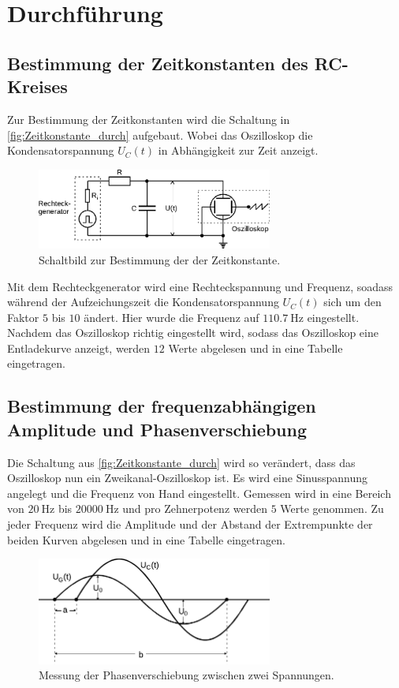 \section{Durchführung}
\label{sec:Durchführung}

\subsection{Bestimmung der Zeitkonstanten des RC-Kreises} %
\label{sub:Zeitkonstante_durch}
Zur Bestimmung der Zeitkonstanten wird die Schaltung in \autoref{fig:Zeitkonstante_durch} aufgebaut.
Wobei das Oszilloskop die Kondensatorspannung $U_C(t)$ in Abhängigkeit zur Zeit anzeigt.
\begin{figure}[H]
    \centering
    \includegraphics[width=0.69\textwidth]{build/Abb_3.pdf}
    \caption{Schaltbild zur Bestimmung der der Zeitkonstante.\cite{v353}}
    \label{fig:Zeitkonstante_durch}
\end{figure}
\noindent Mit dem Rechteckgenerator wird eine Rechteckspannung und Frequenz, soadass während der Aufzeichungszeit die Kondensatorspannung $U_C(t)$ sich um den Faktor $5$ bis $10$ ändert.
Hier wurde die Frequenz auf $\qty{110,7}{\hertz}$ eingestellt.
Nachdem das Oszilloskop richtig eingestellt wird, sodass das Oszilloskop eine Entladekurve anzeigt, werden $12$ Werte abgelesen und in eine Tabelle eingetragen. 
\subsection{Bestimmung der frequenzabhängigen Amplitude und Phasenverschiebung} %
\label{sub:Freque_A&P_durch}
\noindent Die Schaltung aus \autoref{fig:Zeitkonstante_durch} wird so verändert, dass das Oszilloskop nun ein Zweikanal-Oszilloskop ist.
Es wird eine Sinusspannung angelegt und die Frequenz von Hand eingestellt.
Gemessen wird in eine Bereich von $\qty{20}{\hertz}$ bis $\qty{20000}{\hertz}$ und pro Zehnerpotenz werden $5$ Werte genommen.
Zu jeder Frequenz wird die Amplitude und der Abstand der Extrempunkte der beiden Kurven abgelesen und in eine Tabelle eingetragen.
\begin{figure}[H]
    \centering
    \includegraphics[width=0.69\textwidth]{build/Abb_7_edit.pdf}
    \caption {Messung der Phasenverschiebung zwischen zwei Spannungen.\cite{v353}}
    \label{fig:Freque_A&P_durch}
\end{figure}
